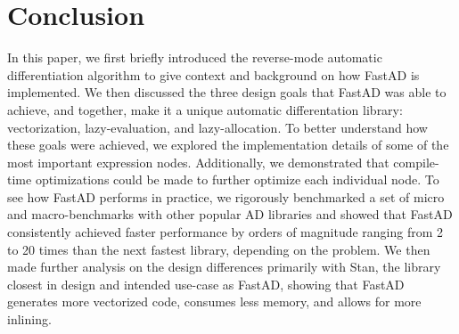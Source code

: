 \section{Conclusion}

In this paper, we first briefly introduced the reverse-mode automatic differentiation algorithm
to give context and background on how FastAD is implemented.
We then discussed the three design goals that FastAD 
was able to achieve, and together, make it a unique automatic differentation library:
vectorization, lazy-evaluation, and lazy-allocation.
To better understand how these goals were achieved,
we explored the implementation details of some of the most important expression nodes.
Additionally, we demonstrated that compile-time optimizations could be made
to further optimize each individual node.
To see how FastAD performs in practice, we rigorously benchmarked 
a set of micro and macro-benchmarks
with other popular AD libraries and showed that FastAD consistently achieved
faster performance by orders of magnitude ranging from 2 to 20 times 
than the next fastest library, depending on the problem.
We then made further analysis on the design differences
primarily with Stan, the library closest in design and intended use-case as FastAD,
showing that FastAD generates more vectorized code,
consumes less memory,
and allows for more inlining.
